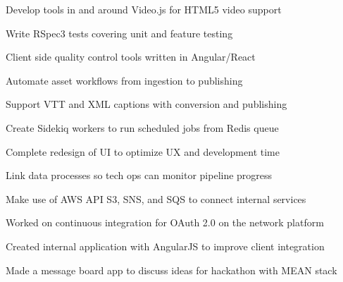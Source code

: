 \documentclass[]{deedy-resume-openfont}
\begin{document}
\begin{minipage}[t]{0.66\textwidth}
\begin{tightemize}
\item Develop tools in and around Video.js for HTML5 video support
\item Write RSpec3 tests covering unit and feature testing
\item Client side quality control tools written in Angular/React
\item Automate asset workflows from ingestion to publishing
\item Support VTT and XML captions with conversion and publishing
\item Create Sidekiq workers to run scheduled jobs from Redis queue
\item Complete redesign of UI to optimize UX and development time
\item Link data processes so tech ops can monitor pipeline progress
\item Make use of AWS API S3, SNS, and SQS to connect internal services
\end{tightemize}
\sectionsep

\begin{tightemize}
\item Worked on continuous integration for OAuth 2.0 on the network platform
\item Created internal application with AngularJS to improve client integration
\item Made a message board app to discuss ideas for hackathon with MEAN stack
\end{tightemize}
\sectionsep



\end{minipage}
\end{document}
